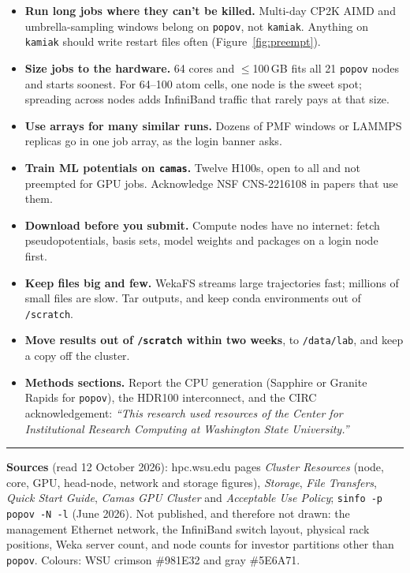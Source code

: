 \documentclass[10pt,letterpaper]{article}
\begin{document}
\begin{itemize}
\item \textbf{Run long jobs where they can't be killed.} Multi-day CP2K AIMD and umbrella-sampling windows belong on \texttt{popov}, not \texttt{kamiak}. Anything on \texttt{kamiak} should write restart files often (Figure~\ref{fig:preempt}).
\item \textbf{Size jobs to the hardware.} 64 cores and $\le$100\,GB fits all 21 \texttt{popov} nodes and starts soonest. For 64--100 atom cells, one node is the sweet spot; spreading across nodes adds InfiniBand traffic that rarely pays at that size.
\item \textbf{Use arrays for many similar runs.} Dozens of PMF windows or LAMMPS replicas go in one job array, as the login banner asks.
\item \textbf{Train ML potentials on \texttt{camas}.} Twelve H100s, open to all and not preempted for GPU jobs. Acknowledge NSF CNS-2216108 in papers that use them.
\item \textbf{Download before you submit.} Compute nodes have no internet: fetch pseudopotentials, basis sets, model weights and packages on a login node first.
\item \textbf{Keep files big and few.} WekaFS streams large trajectories fast; millions of small files are slow. Tar outputs, and keep conda environments out of \texttt{/scratch}.
\item \textbf{Move results out of \texttt{/scratch} within two weeks}, to \texttt{/data/lab}, and keep a copy off the cluster.
\item \textbf{Methods sections.} Report the CPU generation (Sapphire or Granite Rapids for \texttt{popov}), the HDR100 interconnect, and the CIRC acknowledgement: \emph{``This research used resources of the Center for Institutional Research Computing at Washington State University.''}
\end{itemize}

\vfill
{\color{graylight}\rule{\textwidth}{0.6pt}}\par
{\scriptsize\color{wsugray}
\textbf{Sources} (read 12 October 2026): hpc.wsu.edu pages \emph{Cluster Resources} (node, core, GPU, head-node, network and storage figures), \emph{Storage}, \emph{File Transfers}, \emph{Quick Start Guide}, \emph{Camas GPU Cluster} and \emph{Acceptable Use Policy}; \texttt{sinfo -p popov -N -l} (June 2026). Not published, and therefore not drawn: the management Ethernet network, the InfiniBand switch layout, physical rack positions, Weka server count, and node counts for investor partitions other than \texttt{popov}. Colours: WSU crimson \#981E32 and gray \#5E6A71.\par}
\end{document}
